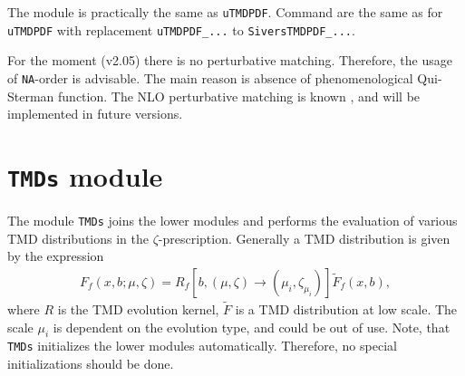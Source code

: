 \documentclass[prd,nofootinbib,eqsecnum,final]{revtex4}
\renewcommand{\(}{\left(}
\renewcommand{\)}{\right)}
\renewcommand{\[}{\left[}
\renewcommand{\]}{\right]}
\begin{document}
The module is practically the same as \texttt{uTMDPDF}. Command are the same as for \texttt{uTMDPDF} with replacement \texttt{uTMDPDF\_...} to \texttt{SiversTMDPDF\_...}.

\begin{tcolorbox}
For the moment (v2.05) there is no perturbative matching. Therefore, the usage of \texttt{NA}-order is advisable. The main reason is absence of phenomenological Qui-Sterman function. The NLO perturbative matching is known \cite{Scimemi:2019gge}, and will be implemented in future versions.
\end{tcolorbox}

\renewcommand{\arraystretch}{1.5}
\newpage


\section{\texttt{TMDs} module}
\label{TMDs}

The module \texttt{TMDs} joins the lower modules and performs the evaluation of various TMD distributions in the $\zeta$-prescription. Generally a TMD distribution is given by the expression
\begin{eqnarray}
F_f(x,b;\mu,\zeta)=R_f[b,(\mu,\zeta)\to(\mu_i,\zeta_{\mu_i})]\tilde F_f(x,b),
\end{eqnarray}
where $R$ is the TMD evolution kernel, $\tilde F$ is a TMD distribution at low scale. The scale $\mu_i$ is dependent on the evolution type, and could be out of use. Note, that \texttt{TMDs} initializes the lower modules automatically. Therefore, no special initializations should be done.
\end{document}
